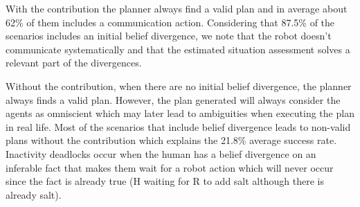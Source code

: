 \documentclass[letterpaper]{article} %
\begin{document}
With the contribution the planner always find a valid plan and in average about 62\% of them includes a communication action. Considering that 87.5\% of the scenarios includes an initial belief divergence, we note that the robot doesn't communicate systematically and that the estimated situation assessment solves a relevant part of the divergences.

Without the contribution, when there are no initial belief divergence, the planner always finds a valid plan. However, the plan generated will always consider the agents as omniscient which may later lead to ambiguities when executing the plan in real life. Most of the scenarios that include belief divergence leads to non-valid plans without the contribution which explains the 21.8\%  average success rate. 
Inactivity deadlocks occur when the human has a belief divergence on an inferable fact that makes them wait for a robot action which will never occur since the fact is already true (H waiting for R to add salt although there is already salt).

\end{document}
